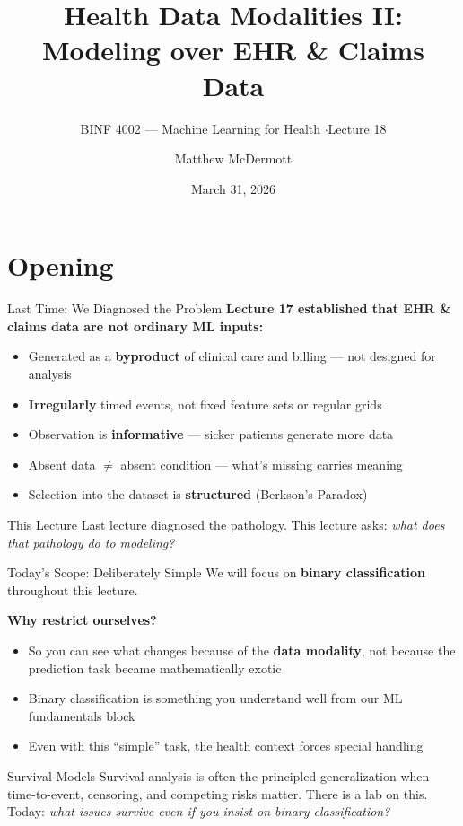 \documentclass[aspectratio=169,10pt]{beamer}
\title{Health Data Modalities II:\\Modeling over EHR \& Claims Data}
\subtitle{BINF 4002 --- Machine Learning for Health \quad$\cdot$\quad Lecture 18}
\author{Matthew McDermott}
\date{March 31, 2026}
\institute{Department of Biomedical Informatics\\Columbia University}
\begin{document}
\maketitle

\section{Opening}

\begin{frame}{Last Time: We Diagnosed the Problem}
\textbf{Lecture 17 established that EHR \& claims data are not ordinary ML inputs:}
\begin{itemize}[<+->]
    \item Generated as a \textbf{byproduct} of clinical care and billing --- not designed for analysis
    \item \textbf{Irregularly} timed events, not fixed feature sets or regular grids
    \item Observation is \textbf{informative} --- sicker patients generate more data
    \item \alert{Absent data $\neq$ absent condition} --- what's missing carries meaning
    \item Selection into the dataset is \textbf{structured} (Berkson's Paradox)
\end{itemize}
\begin{block}{This Lecture}
Last lecture diagnosed the pathology. This lecture asks: \emph{what does that pathology do to modeling?}
\end{block}
\end{frame}

\begin{frame}{Today's Scope: Deliberately Simple}
We will focus on \textbf{binary classification} throughout this lecture.
\vspace{0.3em}

\textbf{Why restrict ourselves?}
\begin{itemize}[<+->]
    \item So you can see what changes because of the \textbf{data modality}, not because the prediction task became mathematically exotic
    \item Binary classification is something you understand well from our ML fundamentals block
    \item Even with this ``simple'' task, the health context forces special handling
\end{itemize}
\begin{block}{Survival Models}
Survival analysis is often the principled generalization when time-to-event, censoring, and competing risks matter. There is a lab on this. Today: \emph{what issues survive even if you insist on binary classification?}
\end{block}
\end{frame}
\end{document}
